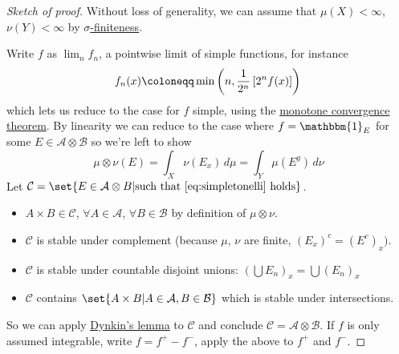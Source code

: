 \documentclass{article}
\newcommand{\1}[1]{\mathbbm{1}_{#1}}
\begin{document}
\begin{proof}[Sketch of proof]
    Without loss of generality, we can assume that $\mu(X) < \infty$, $\nu(Y) < \infty$ by \hyperlink{def:sigFinite}{$\sigma$-finiteness}.

    Write $f$ as $\lim_n f_n$, a pointwise limit of simple functions, for instance
    \begin{equation*}
        f_n(x) \coloneqq \min\left(n, \frac{1}{2^n} \left[2^n f(x)\right]\right) \\
    \end{equation*}
    which lets us reduce to the case for $f$ simple, using the \hyperlink{def:monConv}{monotone convergence theorem}.
    By linearity we can reduce to the case where $f = \1{E}$ for some $E \in \mathcal{A} \otimes \mathcal{B}$ so we're left to show
    \begin{equation*}
        \mu \otimes \nu(E) = \int_X \nu(E_x)\,d\mu = \int_Y \mu(E^y)\,d\nu \tag{$***$}\label{eq:simpletonelli}
    \end{equation*}
    Let $\mathcal{C} = \set{E \in \mathcal{A} \otimes B | \text{such that \eqref{eq:simpletonelli} holds}}$.
    \begin{itemize}
        \item $A \times B \in \mathcal{C}$, $\forall A \in \mathcal{A}$, $\forall B \in \mathcal{B}$ by definition of $\mu \otimes \nu$.
        \item $\mathcal{C}$ is stable under complement (because $\mu$, $\nu$ are finite, $(E_x)^c = (E^c)_x)$.
        \item $\mathcal{C}$ is stable under countable disjoint unions: $(\bigcup E_n)_x = \bigcup(E_n)_x$
        \item $\mathcal{C}$ contains $\set{A \times B | A \in \mathcal{A}, B \in \mathcal{B}}$ which is stable under intersections.
    \end{itemize}
    So we can apply \hyperlink{lem:dynkin}{Dynkin's lemma} to $\mathcal{C}$ and conclude $\mathcal{C} = \mathcal{A} \otimes \mathcal{B}$.
    If $f$ is only assumed integrable, write $f = f^+ - f^-$, apply the above to $f^+$ and $f^-$.
\end{proof}

\end{document}
